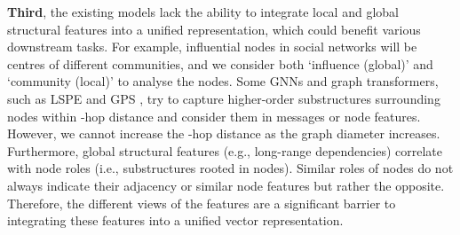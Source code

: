 \documentclass[oneside]{article}
\begin{document}
\textbf{{Third}}, the existing models lack the ability to integrate local and global structural features into a unified representation, which could benefit various downstream tasks. 
For example, influential nodes in social networks will be centres of different communities, and we consider both `influence (global)' and `community (local)' to analyse the nodes. 
Some GNNs and graph transformers, such as LSPE \cite{DBLP:conf/iclr/DwivediL0BB22} and GPS \cite{DBLP:conf/nips/RampasekGDLWB22}, try to capture higher-order substructures surrounding nodes within -hop distance and consider them in messages or node features.
However, we cannot increase the -hop distance as the graph diameter increases. 
Furthermore, global structural features (e.g., long-range dependencies) correlate with node roles (i.e., substructures rooted in nodes). 
Similar roles of nodes do not always indicate their adjacency or similar node features but rather the opposite.
Therefore, the different views of the features are a significant barrier to integrating these features into a unified vector representation.
\end{document}
